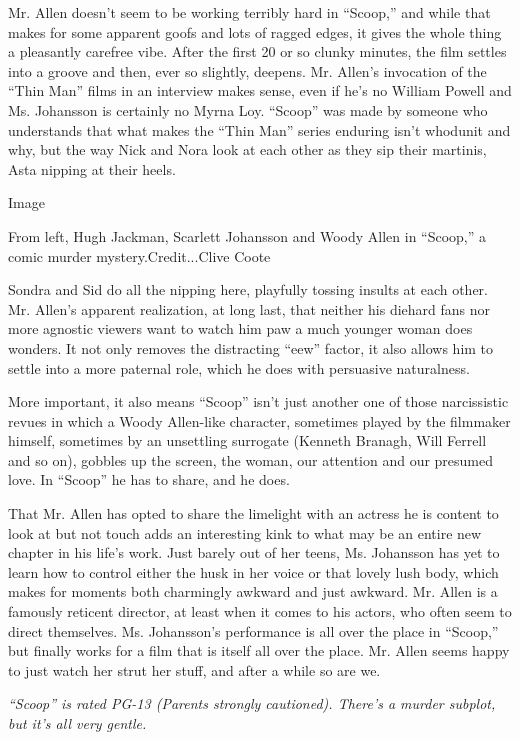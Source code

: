 Mr. Allen doesn't seem to be working terribly hard in ``Scoop,'' and
while that makes for some apparent goofs and lots of ragged edges, it
gives the whole thing a pleasantly carefree vibe. After the first 20 or
so clunky minutes, the film settles into a groove and then, ever so
slightly, deepens. Mr. Allen's invocation of the ``Thin Man'' films in
an interview makes sense, even if he's no William Powell and Ms.
Johansson is certainly no Myrna Loy. ``Scoop'' was made by someone who
understands that what makes the ``Thin Man'' series enduring isn't
whodunit and why, but the way Nick and Nora look at each other as they
sip their martinis, Asta nipping at their heels.

Image

From left, Hugh Jackman, Scarlett Johansson and Woody Allen in
``Scoop,'' a comic murder mystery.Credit...Clive Coote

Sondra and Sid do all the nipping here, playfully tossing insults at
each other. Mr. Allen's apparent realization, at long last, that neither
his diehard fans nor more agnostic viewers want to watch him paw a much
younger woman does wonders. It not only removes the distracting ``eew''
factor, it also allows him to settle into a more paternal role, which he
does with persuasive naturalness.

More important, it also means ``Scoop'' isn't just another one of those
narcissistic revues in which a Woody Allen-like character, sometimes
played by the filmmaker himself, sometimes by an unsettling surrogate
(Kenneth Branagh, Will Ferrell and so on), gobbles up the screen, the
woman, our attention and our presumed love. In ``Scoop'' he has to
share, and he does.

That Mr. Allen has opted to share the limelight with an actress he is
content to look at but not touch adds an interesting kink to what may be
an entire new chapter in his life's work. Just barely out of her teens,
Ms. Johansson has yet to learn how to control either the husk in her
voice or that lovely lush body, which makes for moments both charmingly
awkward and just awkward. Mr. Allen is a famously reticent director, at
least when it comes to his actors, who often seem to direct themselves.
Ms. Johansson's performance is all over the place in ``Scoop,'' but
finally works for a film that is itself all over the place. Mr. Allen
seems happy to just watch her strut her stuff, and after a while so are
we.

\emph{``Scoop'' is rated PG-13 (Parents strongly cautioned). There's a
murder subplot, but it's all very gentle.}

